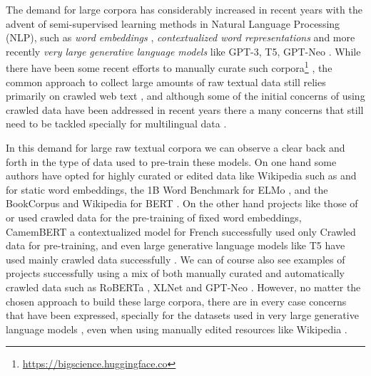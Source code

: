 The demand for large corpora has considerably increased in recent years with the advent of semi-supervised learning methods in Natural Language Processing (NLP), such as \emph{word embeddings} \cite{mikolov-etal-2013-distributed,pennington-etal-2014-glove,mikolov-etal-2018-advances}, \emph{contextualized word representations} \cite{howard-ruder-2018-universal,peters-etal-2018-deep,devlin-etal-2019-bert} and more recently \emph{very large generative language models} like GPT-3, T5, GPT-Neo \cite{raffel-etal-2020-exploring,brown-etal-2020-language,black-etal-2021-gpt}. While there have been some recent efforts to manually curate such corpora\footnote{\url{https://bigscience.huggingface.co}} \cite{gao-etal-2020-pile}, the common approach to collect large amounts of raw textual data still relies primarily on crawled web text \cite{ortiz-suarez-etal-2019-asynchronous,ortiz-suarez-etal-2020-monolingual,xue-etal-2021-mt5,el-kishky-etal-2020-ccaligned,espla-etal-2019-paracrawl,banon-etal-2020-paracrawl,gao-etal-2020-pile}, and although some of the initial concerns of using crawled data \cite{trinh-le-2018-a,radford-etal-2019-language} have been addressed in recent years \cite{ortiz-suarez-etal-2020-monolingual,martin-etal-2020-camembert} there a many concerns that still need to be tackled \cite{caswell-etal-2020-language} specially for multilingual data \cite{caswell-etal-2021-quality}.

In this demand for large raw textual corpora we can observe a clear back and forth in the type of data used to pre-train these models. On one hand some authors have opted for highly curated or edited data like Wikipedia such as  and  for static word embeddings, the 1B Word Benchmark \cite{chelba-etal-2014-one} for ELMo \cite{peters-etal-2018-deep}, and the BookCorpus \cite{zhu-etal-2015-aligning} and Wikipedia for BERT \cite{devlin-etal-2019-bert}. On the other hand projects like those of  or  used crawled data for the pre-training of fixed word embeddings, CamemBERT \cite{martin-etal-2020-camembert} a contextualized model for French successfully used only Crawled data for pre-training, and even large generative language models like T5 have used mainly crawled data successfully \cite{raffel-etal-2020-exploring}. We can of course also see examples of projects successfully using a mix of both manually curated and automatically crawled data such as RoBERTa \cite{liu-etal-2019-roberta}, XLNet \cite{yang-etal-2019-xlnet} and GPT-Neo \cite{black-etal-2021-gpt,gao-etal-2020-pile}. However, no matter the chosen approach to build these large corpora, there are in every case concerns that have been expressed, specially for the datasets used in very large generative language models \cite{bender-etal-2021-on}, even when using manually edited resources like Wikipedia \cite{barera-2020-mind}.

